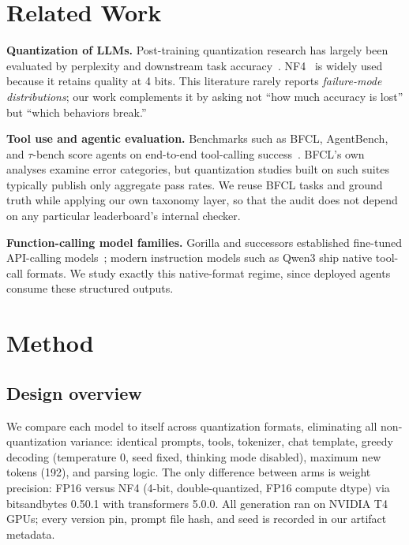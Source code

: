 \documentclass{article}
\begin{document}
\section{Related Work}
\label{sec:related}

\textbf{Quantization of LLMs.} Post-training quantization research has
largely been evaluated by perplexity and downstream task
accuracy~\citep{dettmers2022llmint8,frantar2023gptq,lin2024awq,xiao2023smoothquant,gholami2022survey}.
NF4~\citep{dettmers2023qlora} is widely used because it retains quality at 4
bits. This literature rarely reports \emph{failure-mode distributions};
our work complements it by asking not ``how much accuracy is lost'' but
``which behaviors break.''

\textbf{Tool use and agentic evaluation.} Benchmarks such as BFCL, AgentBench,
and $\tau$-bench score agents on end-to-end tool-calling
success~\citep{yan2024bfcl,liu2023agentbench,yao2024taubench}. BFCL's own
analyses examine error categories, but quantization studies built on such
suites typically publish only aggregate pass rates. We reuse BFCL tasks and
ground truth while applying our own taxonomy layer, so that the audit does
not depend on any particular leaderboard's internal checker.

\textbf{Function-calling model families.} Gorilla and successors established
fine-tuned API-calling models~\citep{patil2023gorilla}; modern instruction
models such as Qwen3 ship native tool-call formats. We study exactly this
native-format regime, since deployed agents consume these structured outputs.

\section{Method}
\label{sec:method}

\subsection{Design overview}

We compare each model to itself across quantization formats, eliminating all
non-quantization variance: identical prompts, tools, tokenizer, chat
template, greedy decoding (temperature 0, seed fixed, thinking mode
disabled), maximum new tokens (192), and parsing logic. The only difference
between arms is weight precision: FP16 versus NF4 (4-bit, double-quantized,
FP16 compute dtype) via bitsandbytes 0.50.1 with transformers 5.0.0. All
generation ran on NVIDIA T4 GPUs; every version pin, prompt file hash, and
seed is recorded in our artifact metadata.
\end{document}
